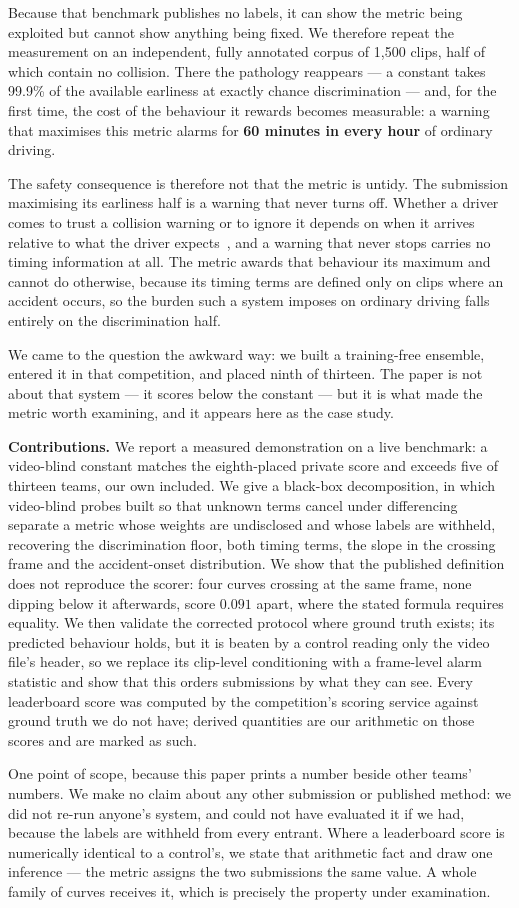 Because that benchmark publishes no labels, it can show the metric being
exploited but cannot show anything being fixed. We therefore repeat the
measurement on an independent, fully annotated corpus of 1{,}500 clips, half of
which contain no collision. There the pathology reappears --- a constant takes
99.9\% of the available earliness at exactly chance discrimination --- and, for
the first time, the cost of the behaviour it rewards becomes measurable: a
warning that maximises this metric alarms for \textbf{60 minutes in every hour}
of ordinary driving.

The safety consequence is therefore not that the metric is untidy. The
submission maximising its earliness half is a warning that never turns off.
Whether a driver comes to trust a collision warning or to ignore it depends on
when it arrives relative to what the driver expects~\cite{abe2006alarm}, and a
warning that never stops carries no timing information at all. The metric
awards that behaviour its maximum and cannot do otherwise, because its timing
terms are defined only on clips where an accident occurs, so the burden such a
system imposes on ordinary driving falls entirely on the discrimination half.

We came to the question the awkward way: we built a training-free ensemble,
entered it in that competition, and placed ninth of thirteen. The paper is not
about that system --- it scores below the constant --- but it is what made the
metric worth examining, and it appears here as the case study.

\textbf{Contributions.} We report a measured demonstration on a live
benchmark: a video-blind constant matches the eighth-placed private score and
exceeds five of thirteen teams, our own included. We give a black-box
decomposition, in which video-blind probes built so that unknown terms cancel
under differencing separate a metric whose weights are undisclosed and whose
labels are withheld, recovering the discrimination floor, both timing terms,
the slope in the crossing frame and the accident-onset distribution. We show
that the published definition does not reproduce the scorer: four curves
crossing at the same frame, none dipping below it afterwards, score $0.091$
apart, where the stated formula requires equality. We then validate the
corrected protocol where ground truth exists; its predicted behaviour holds,
but it is beaten by a control reading only the video file's header, so we
replace its clip-level conditioning with a frame-level alarm statistic and show
that this orders submissions by what they can see. Every leaderboard score was
computed by the competition's scoring service against ground truth we do not
have; derived quantities are our arithmetic on those scores and are marked as
such.

One point of scope, because this paper prints a number beside other teams'
numbers. We make no claim about any other submission or published method: we
did not re-run anyone's system, and could not have evaluated it if we had,
because the labels are withheld from every entrant. Where a leaderboard score
is numerically identical to a control's, we state that arithmetic fact and draw
one inference --- the metric assigns the two submissions the same value. A
whole family of curves receives it, which is precisely the property under
examination.
